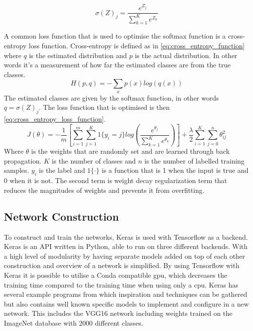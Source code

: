 \begin{equation}
\label{eq:softmax_activation_function}
\sigma(Z)_{j} = \frac{e^{Z_j}}{\sum_{k=1}^{K}e^{Z_k}}
\end{equation}

A common loss function that is used to optimise the softmax function is a cross-entropy loss function. Cross-entropy is defined as in \autoref{eq:cross_entropy_function} where $q$ is the estimated distribution and $p$ is the actual distribution. In other words it's a measurement of how far the estimated classes are from the true classes.
\begin{equation}
\label{eq:cross_entropy_function}
H(p,q) = -\sum_{x}p(x)log(q(x))
\end{equation}
The estimated classes are given by the softmax function, in other words $q = \sigma(Z)_{j} $. The loss function that is optimised is then \autoref{eq:cross_entropy_loss_function}.
\begin{equation}
\label{eq:cross_entropy_loss_function}
J(\theta) = -\frac{1}{m}\left[ \sum_{i=1}^{m}\sum_{j=1}^{K} 1\{y_i=j\}  log\left( \frac{e^{\theta_j}}{\sum_{k=1}^{K}e^{\theta_k}} \right)\right] + \frac{\lambda}{2} \sum_{i=1}^{K} \sum_{j=0}^{n} \theta_{ij}^{2}
\end{equation}
Where $\theta$ is the weights that are randomly set and are learned through back propagation. $K$ is the number of classes and $n$ is the number of labelled training samples. $y_i$ is the label and $1\{\cdot\}$ is a function that is 1 when the input is true and 0 when it is not. The second term is weight decay regularization term that reduces the magnitudes of weights and prevents it from overfitting.


\subsection{Network Construction}
To construct and train the networks, Keras is used with Tensorflow as a backend. Keras is an API written in Python, able to run on three different backends. With a high level of modularity by having separate models added on top of each other construction and overview of a network is simplified. By using Tensorflow with Keras it is possible to utilise a Conda compatible \gls{gpu}, which decreases the training time compared to the training time when using only a \gls{cpu}. Keras has several example programs from which inspiration and techniques can be gathered but also contains well known specific models to implement and configure in a new network. This includes the VGG16 network including weights trained on the ImageNet database with 2000 different classes.



